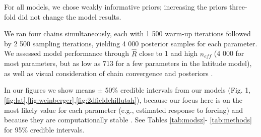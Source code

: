 \documentclass{article}
\begin{document}
\noindent For all models, we chose weakly informative priors; increasing the priors three-fold did not change the model results. 

We ran four chains simultaneously, each with 1 500 warm-up iterations followed by 2 500 sampling iterations, yielding 4 000 posterior samples for each parameter. We assessed model performance through $\hat{R}$ close to 1 and high $n_{eff}$ (4 000 for most parameters, but as low as 713 for a few parameters in the latitude model), as well as visual consideration of chain convergence and posteriors \citep{BDA}. 

In our figures  we show means $\pm$ 50\% credible intervals from our models (Fig. 1, \ref{fig:lat},\ref{fig:weinberger},\ref{fig:2dfieldchillutah}), because our focus here is on the most likely value for each parameter (e.g., estimated response to forcing) and because they are computationally stable \citep{BDA,Carpenter:2016aa}. See Tables \ref{tab:modsz}- \ref{tab:methods} for 95\% credible intervals. 
\end{document}
